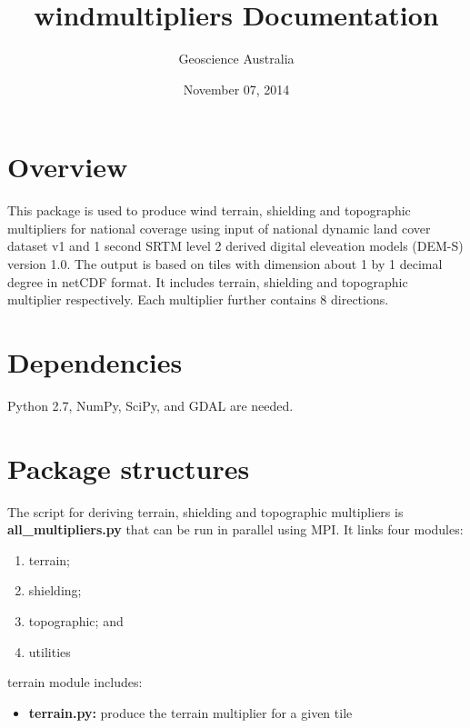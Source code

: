 \documentclass[letterpaper,10pt,english]{sphinxmanual}
\title{windmultipliers Documentation}
\date{November 07, 2014}
\author{Geoscience Australia}
\begin{document}
\maketitle
\tableofcontents
{}\label{index::doc}



\chapter{Overview}
\label{index:wind-multipliers}\label{index:overview}
This package is used to produce wind terrain, shielding and topographic multipliers for national coverage using input of national dynamic land cover dataset v1 and 1 second SRTM level 2 derived digital eleveation models (DEM-S) version 1.0. The output is based on tiles with dimension about 1 by 1 decimal degree in netCDF format. It includes terrain, shielding and topographic multiplier respectively. Each multiplier further contains 8 directions.


\chapter{Dependencies}
\label{index:dependencies}
Python 2.7, NumPy, SciPy, and GDAL are needed.


\chapter{Package structures}
\label{index:package-structures}
The script for deriving terrain, shielding and topographic multipliers is
\textbf{all\_multipliers.py} that can be run in parallel using MPI. It links four modules:
\begin{enumerate}
\item {} 
terrain;

\item {} 
shielding;

\item {} 
topographic; and

\item {} 
utilities

\end{enumerate}

terrain module includes:
\begin{itemize}
\item {} 
\textbf{terrain.py:} produce the terrain multiplier for a given tile

\end{itemize}
\end{document}
